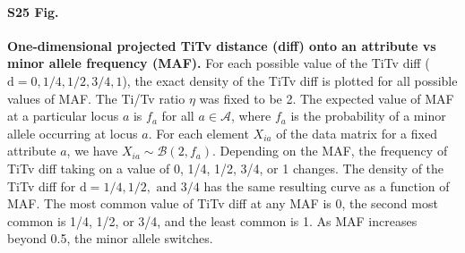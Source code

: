 \documentclass[10pt,letterpaper]{article}
\begin{document}
\paragraph*{S25 Fig.}
\label{S25_Fig}
{\bf One-dimensional projected TiTv distance (diff) onto an attribute vs minor allele frequency (MAF).} For each possible value of the TiTv diff ($\text{d} = 0,1/4,1/2,3/4,1$), the exact density of the TiTv diff is plotted for all possible values of MAF. The Ti/Tv ratio $\eta$ was fixed to be 2. The expected value of MAF at a particular locus $a$ is $f_a$ for all $a \in \mathcal{A}$, where $f_a$ is the probability of a minor allele occurring at locus $a$. For each element $X_{ia}$ of the data matrix for a fixed attribute $a$, we have $X_{ia} \sim \mathcal{B}(2,f_a)$. Depending on the MAF, the frequency of TiTv diff taking on a value of 0, 1/4, 1/2, 3/4, or 1 changes. The density of the TiTv diff for $\text{d} = 1/4, 1/2, \text{ and } 3/4$ has the same resulting curve as a function of MAF. The most common value of TiTv diff at any MAF is 0, the second most common is 1/4, 1/2, or 3/4, and the least common is 1. As MAF increases beyond 0.5, the minor allele switches.


\nolinenumbers

%
%
% 

%



\end{document}
